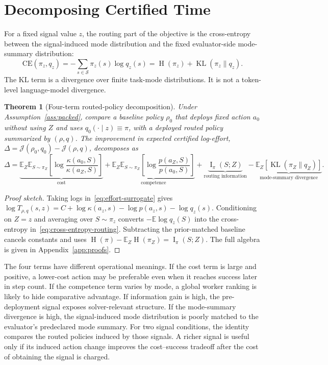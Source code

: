 \documentclass{article}
\newtheorem{theorem}{Theorem}
\DeclareMathOperator{\KL}{KL}
\DeclareMathOperator{\MI}{I}
\DeclareMathOperator{\Hent}{H}
\newcommand{\cS}{\mathcal{S}}
\newcommand{\E}{\mathbb{E}}
\newcommand{\J}{\mathcal{J}}
\begin{document}
\section{Decomposing Certified Time}
\label{sec:accounting}

For a fixed signal value $z$, the routing part of the objective is the cross-entropy between the signal-induced mode distribution and the fixed evaluator-side mode-summary distribution:
\begin{equation}
  \mathrm{CE}(\pi_z,q_z)
  =
  -\sum_{s\in\cS}\pi_z(s)\log q_z(s)
  =
  \Hent(\pi_z)+\KL(\pi_z\|q_z).
  \label{eq:cross-entropy-routing}
\end{equation}
The KL term is a divergence over finite task-mode distributions.
It is not a token-level language-model divergence.

\begin{theorem}[Four-term routed-policy decomposition]
\label{thm:four-term}
Under Assumption~\ref{ass:packed}, compare a baseline policy $\rho_0$ that deploys fixed action $a_0$ without using $Z$ and uses $q_0(\cdot\mid z)\equiv\pi$, with a deployed routed policy summarized by $(\rho,q)$.
The improvement in expected certified log-effort,
$\Delta=\J(\rho_0,q_0)-\J(\rho,q)$, decomposes as
\begin{equation}
\label{eq:four-term}
  \Delta
  =
  \underbrace{\E_Z\E_{S\sim\pi_Z}\!\left[\log\frac{\kappa(a_0,S)}{\kappa(a_Z,S)}\right]}_{\text{cost}}
  +
  \underbrace{\E_Z\E_{S\sim\pi_Z}\!\left[\log\frac{p(a_Z,S)}{p(a_0,S)}\right]}_{\text{competence}}
  +
  \underbrace{\MI_\pi(S;Z)}_{\text{routing information}}
  -
  \underbrace{\E_{Z}\!\left[\KL(\pi_{Z}\|q_{Z})\right]}_{\text{mode-summary divergence}} .
\end{equation}
\end{theorem}

\begin{proof}[Proof sketch]
Taking logs in~\eqref{eq:effort-surrogate} gives
$\log T_{\rho,q}(s,z)=C+\log\kappa(a_z,s)-\log p(a_z,s)-\log q_z(s)$.
Conditioning on $Z=z$ and averaging over $S\sim\pi_z$ converts
$-\E\log q_z(S)$ into the cross-entropy in~\eqref{eq:cross-entropy-routing}.
Subtracting the prior-matched baseline cancels constants and uses
$\Hent(\pi)-\E_Z\Hent(\pi_Z)=\MI_\pi(S;Z)$.
The full algebra is given in Appendix~\ref{app:proofs}.
\end{proof}

The four terms have different operational meanings.
If the cost term is large and positive, a lower-cost action may be preferable even when it reaches success later in step count.
If the competence term varies by mode, a global worker ranking is likely to hide comparative advantage.
If information gain is high, the pre-deployment signal exposes solver-relevant structure.
If the mode-summary divergence is high, the signal-induced mode distribution is poorly matched to the evaluator's predeclared mode summary.
For two signal conditions, the identity compares the routed policies induced by those signals.
A richer signal is useful only if its induced action change improves the cost--success tradeoff after the cost of obtaining the signal is charged.
\end{document}
